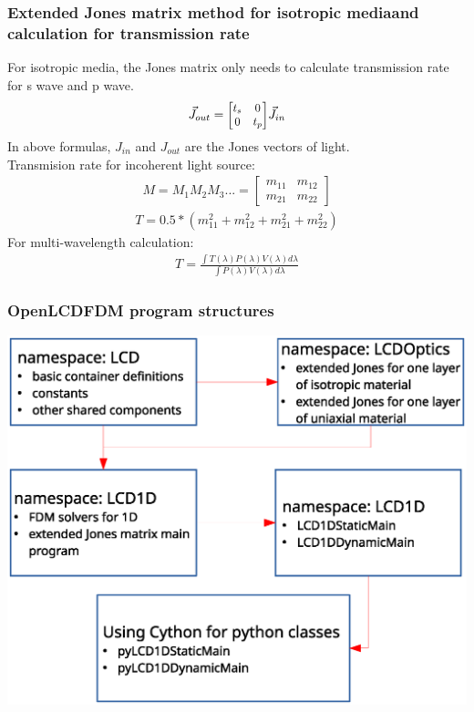 \documentclass{beamer}
\newcommand\scalemath[2]{\scalebox{#1}{\mbox{\ensuremath{\displaystyle #2}}}} %
\begin{document}
\begin{frame}
\frametitle{Extended Jones matrix method for isotropic mediaand calculation for transmission rate}
For isotropic media, the Jones matrix only needs to calculate transmission rate for s wave and p wave.
\begin{eqnarray}
\vec{J}_{out} = 
\scalemath{0.9}{
\begin{bmatrix}
{t}_s & 0 \\ 0 & {t}_p
\end{bmatrix}
}
\vec{J}_{in} \nonumber
\nonumber
\label{eq:extendedJones_iso}
\end{eqnarray}
In above formulas, $J_{in}$ and $J_{out}$ are the Jones vectors of light.\\
Transmision rate for incoherent light source:
\begin{eqnarray}
M = M_1M_2M_3... = 
\begin{bmatrix}
m_{11} & m_{12} \\ m_{21} & m_{22}
\end{bmatrix}
\nonumber
\end{eqnarray}
\begin{eqnarray}
T = 0.5*(m_{11}^2 + m_{12}^2 + m_{21}^2 + m_{22}^2) \nonumber
\end{eqnarray}
For multi-wavelength calculation:
\begin{eqnarray}
T = \frac{\int T(\lambda)P(\lambda)V(\lambda) d\lambda}{\int P(\lambda)V(\lambda) d\lambda} \nonumber
\end{eqnarray}
\end{frame}
\begin{frame}
\frametitle{OpenLCDFDM program structures}
\begin{center}
\includegraphics[scale=0.4]{openlcdfdm_structure.eps}
\end{center}
\end{frame}
\end{document}
